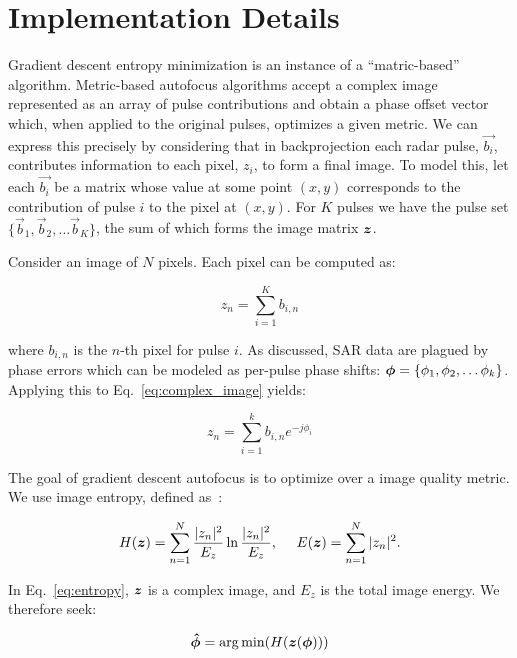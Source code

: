 \section{Implementation Details}\label{sec:implementation}

Gradient descent entropy minimization is an instance of a ``matric-based''
algorithm. Metric-based autofocus algorithms accept a complex image represented
as an array of pulse contributions and obtain a phase offset vector which, when
applied to the original pulses, optimizes a given metric. We can express this
precisely by considering that in backprojection each radar pulse, $\vec{b_i}$,
contributes information to each pixel, $z_i$, to form a final image. To model
this, let each $\vec{b_i}$ be a matrix whose value at some point $(x,y)$
corresponds to the contribution of pulse $i$ to the pixel at $(x,y)$.  For $K$
pulses we have the pulse set $\{\vec{b}_1, \vec{b}_2, \dots \vec{b}_K\}$,
the sum of which forms the image matrix $\bm{z}$.

Consider an image of $N$ pixels. Each pixel can be computed as:

\begin{equation}\label{eq:complex_image}
z_n = \sum_{i=1}^{K} b_{i,n}
\end{equation}

where $b_{i,n}$ is the $n$-th pixel for pulse $i$. As discussed, SAR data are
plagued by phase errors which can be modeled as per-pulse phase shifts:
$\bm{\phi} = \{\phi_1, \phi_2, \dots \phi_k\}$. Applying this to
Eq.~\ref{eq:complex_image} yields:

\begin{equation}\label{eq:phase_complex_image}
z_n = \sum_{i=1}^{k} b_{i,n}e^{-j\phi_i}
\end{equation}

The goal of gradient descent autofocus is to optimize over a image quality
metric. We use image entropy, defined as~\cite{kragh2006monotonic}:

\begin{equation}\label{eq:entropy}
  H(\zb) = \sum_{n=1}^{N} \frac{|z_n|^2}{E_z} \ln
  \frac{|z_n|^2}{E_z}
  \text{,\indent} E(\zb) = \sum_{n=1}^{N} |z_n|^2.
\end{equation}

In Eq.~\ref{eq:entropy}, $\bm{z}$ is a complex image, and $E_z$ is
the total image energy. We therefore seek:

\begin{equation}\label{eq:arg_min}
  \bm{\hat{\phi}} = \operatorname*{arg\,min}(H(\bm{z}(\bm{\phi})))
\end{equation}

